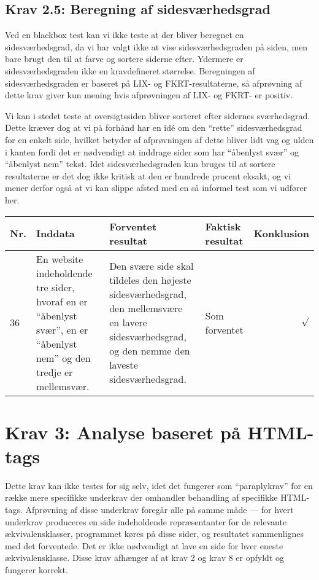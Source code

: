 \documentclass[a4paper,oneside,article]{memoir}
\begin{document}
\begin{landscape}
\subsection{Krav 2.5: Beregning af sidesværhedsgrad}
Ved en blackbox test kan vi ikke teste at der bliver beregnet en
sidesværhedsgrad, da vi har valgt ikke at vise sidesværhedsgraden på
siden, men bare brugt den til at farve og sortere siderne
efter. Ydermere er sidesværhedsgraden ikke en kravdefineret
størrelse. Beregningen af sidesværhedsgraden er baseret på LIX- og
FKRT-resultaterne, så afprøvning af dette krav giver kun mening hvis
afprøvningen af LIX- og FKRT- er positiv.

Vi kan i stedet teste at oversigtssiden bliver sorteret efter sidernes
sværhedsgrad. Dette kræver dog at vi på forhånd har en idé om den
``rette'' sidesværhedsgrad for en enkelt side, hvilket betyder af
afprøvningen af dette bliver lidt vag og ulden i kanten fordi det er
nødvendigt at inddrage sider som har ``åbenlyst svær'' og ``åbenlyst
nem'' tekst. Idet sidesværhedsgraden kun bruges til at sortere
resultaterne er det dog ikke kritisk at den er hundrede procent
eksakt, og vi mener derfor også at vi kan slippe afsted med en så
informel test som vi udfører her.

\begin{longtable}[c]{p{20pt}|p{220pt}|p{130pt}|p{130pt}|r}
\textbf{Nr.} &
\textbf{Inddata} &
\textbf{Forventet resultat} &
\textbf{Faktisk resultat} &
\textbf{Konklusion} \\ \hline

36 &
En website indeholdende tre sider, hvoraf en er ``åbenlyst svær'', en
er ``åbenlyst nem'' og den tredje er mellemsvær. &
Den svære side skal tildeles den højeste sidesværhedsgrad, den
mellemsvære en lavere sidesværhedsgrad, og den nemme den laveste
sidesværhedsgrad. &
Som forventet &
$\surd$ \\ \hline

\end{longtable}

\section{Krav 3: Analyse baseret på HTML-tags}

Dette krav kan ikke testes for sig selv, idet det fungerer som
``paraplykrav'' for en række mere specifikke underkrav der omhandler
behandling af specifikke HTML-tags. Afprøvning af disse underkrav
foregår alle på samme måde --- for hvert underkrav produceres en side
indeholdende repræsentanter for de relevante ækvivalensklasser,
programmet køres på disse sider, og resultatet sammenlignes med det
forventede. Det er ikke nødvendigt at lave en side for hver eneste
ækvivalensklasse. Disse krav afhænger af at krav 2 og krav 8 er
opfyldt og fungerer korrekt.


\end{landscape}
\end{document}
